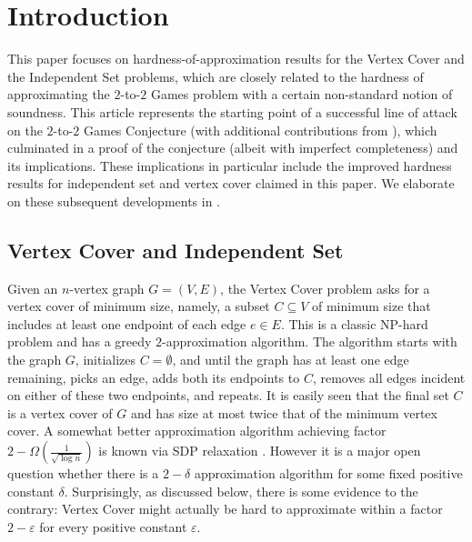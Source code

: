\documentclass{toc}
\newcommand\eps{\varepsilon}
\begin{document}
%
%
%
\section{Introduction}

This paper %
focuses  %
on hardness-of-approximation results for the Vertex Cover and the Independent Set problems, which are closely related to
the hardness of approximating the $2$-to-$2$ Games problem with a certain non-standard notion of soundness.
This %
article  %
represents the starting point of a successful line of attack on the $2$-to-$2$ Games Conjecture %
\cite{conf-version,DKKMS1,DKKMS2,KMS2} %
(with additional contributions from \cite{KS,KMMS,BKS}),
which culminated in a proof of the conjecture (albeit with imperfect completeness) and its implications. These implications in particular include the improved hardness results
for independent set and vertex cover claimed in this paper. We elaborate on these subsequent developments in .


\subsection{Vertex Cover and Independent Set}
Given an $n$-vertex  graph
$G=(V,E)$, the Vertex Cover problem asks for a
vertex cover of minimum size, namely, a subset $C \subseteq V$ of minimum size that includes
  at least one  endpoint of each edge $e \in E$. This is a classic NP-hard problem and
 has a greedy $2$-approximation algorithm. The algorithm starts with the graph $G$, initializes $C = \emptyset$, and
 until the graph has at least one edge remaining, picks an edge,
adds both its endpoints to $C$, removes all edges incident on either of these two endpoints, and repeats. It is easily seen
that the final set $C$ is a vertex cover of $G$ and has size at most twice that of the minimum vertex cover.  A somewhat better
approximation algorithm achieving factor $2- \Omega\left(\frac{1}{\sqrt{\log n}}\right)$  is known via SDP relaxation \cite{Hal02,Kara09}. However it is a
major open question whether there is a $2-\delta$ approximation algorithm for some fixed positive
constant $\delta$. Surprisingly, as discussed below, there is some evidence to the
contrary: Vertex Cover might actually be hard to approximate
 within a factor $2-\eps$ for every positive constant $\eps$.
\end{document}
